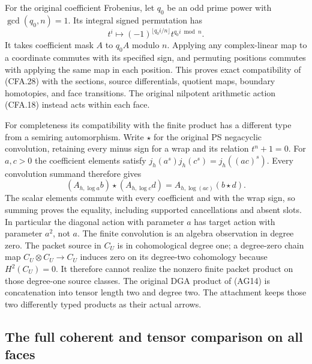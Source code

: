 For the original coefficient Frobenius, let $q_0$ be an odd prime
power with $\gcd(q_0,n)=1$.  Its integral signed permutation has
\[
 t^i\longmapsto(-1)^{\lfloor q_0i/n\rfloor}t^{q_0i\bmod n}.
                                                               \tag{CFA.28}
\]
It takes coefficient mask $A$ to $q_0A$ modulo $n$.
Applying any complex-linear map to a coordinate commutes with its
specified sign, and permuting positions commutes with applying the
same map in each position.  This proves exact compatibility of
(CFA.28) with the sections, source differentials, quotient maps,
boundary homotopies, and face transitions.  The original nilpotent
arithmetic action (CFA.18) instead acts within each face.

For completeness its compatibility with the finite product has a
different type from a semiring automorphism.  Write $\star$ for the
original PS negacyclic convolution, retaining every minus sign for
a wrap and its relation $t^n+1=0$.  For $a,c>0$ the coefficient
elements satisfy $j_h(a^s)j_h(c^s)=j_h((ac)^s)$.  Every convolution
summand therefore gives
\[
 (A_{h,\log a}b)\star(A_{h,\log c}d)
       =A_{h,\log(ac)}(b\star d).                            \tag{CFA.29}
\]
The scalar elements commute with every coefficient and with the wrap
sign, so summing proves the equality, including supported cancellations
and absent slots.  In particular the diagonal action with parameter
$a$ has target action with parameter $a^2$, not $a$.
The finite convolution is an algebra observation in degree zero.
The packet source in $C_U$ is in cohomological degree one; a degree-zero
chain map $C_U\otimes C_U\to C_U$ induces zero on its degree-two
cohomology because $H^2(C_U)=0$.  It therefore cannot realize the
nonzero finite packet product on those degree-one source classes.
The original DGA product of (AG14) is concatenation into tensor length
two and degree two.  The attachment keeps those two differently typed
products as their actual arrows.

\subsection{The full coherent and tensor comparison on all faces}

